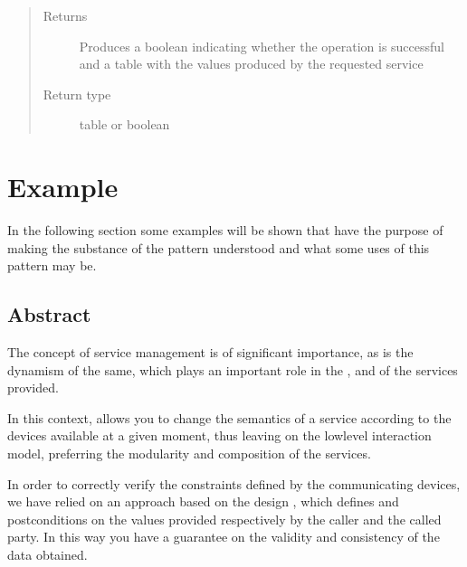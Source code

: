 \documentclass[a4paper,10pt,english,openany,oneside]{sphinxmanual}
\begin{document}
\begin{fulllineitems}
\begin{fulllineitems}
\begin{quote}
\begin{description}
\item[{Returns}] \leavevmode
Produces a boolean indicating whether the operation is successful and a table with the values ​​produced by the requested service

\item[{Return type}] \leavevmode
table or boolean

\end{description}\end{quote}

\end{fulllineitems}


\end{fulllineitems}



\chapter{Example}
\label{\detokenize{example:example}}\label{\detokenize{example::doc}}
In the following section some examples will be shown that have the purpose of making
the substance of the pattern  understood and what some uses of this pattern may be.


\section{Abstract}
\label{\detokenize{example:abstract}}
The concept of service management is of significant importance, as is the dynamism of the
same, which plays an important role in the ,  and  of the services provided.

In this context,  allows you to change the semantics of a service according to the
devices available at a given moment, thus leaving  on the low\sphinxhyphen{}level
interaction model, preferring the modularity and composition of the services.

In order to correctly verify the constraints defined by the communicating devices,
we have relied on an approach based on the design , which defines  and
post\sphinxhyphen{}conditions on the values ​​provided respectively by the caller and the called party. In this
way you have a guarantee on the validity and consistency of the data obtained.
\end{document}
